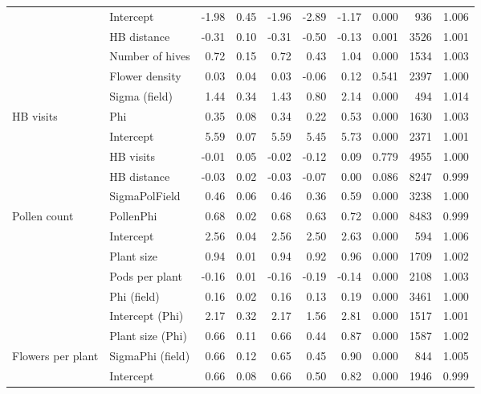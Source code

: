 \begin{table}[ht]
\begin{tabular}{l|l|r|r|r|r|r|r|r|r}
 & Intercept & -1.98 & 0.45 & -1.96 & -2.89 & -1.17 & 0.000 & 936 & 1.006\\
\cline{2-10}
 & HB distance & -0.31 & 0.10 & -0.31 & -0.50 & -0.13 & 0.001 & 3526 & 1.001\\
\cline{2-10}
 & Number of hives & 0.72 & 0.15 & 0.72 & 0.43 & 1.04 & 0.000 & 1534 & 1.003\\
\cline{2-10}
 & Flower density & 0.03 & 0.04 & 0.03 & -0.06 & 0.12 & 0.541 & 2397 & 1.000\\
\cline{2-10}
 & Sigma (field) & 1.44 & 0.34 & 1.43 & 0.80 & 2.14 & 0.000 & 494 & 1.014\\
\cline{2-10}
\multirow{-6}{*}{\raggedright\arraybackslash HB visits} & Phi & 0.35 & 0.08 & 0.34 & 0.22 & 0.53 & 0.000 & 1630 & 1.003\\
\cline{1-10}
 & Intercept & 5.59 & 0.07 & 5.59 & 5.45 & 5.73 & 0.000 & 2371 & 1.001\\
\cline{2-10}
 & HB visits & -0.01 & 0.05 & -0.02 & -0.12 & 0.09 & 0.779 & 4955 & 1.000\\
\cline{2-10}
 & HB distance & -0.03 & 0.02 & -0.03 & -0.07 & 0.00 & 0.086 & 8247 & 0.999\\
\cline{2-10}
 & SigmaPolField & 0.46 & 0.06 & 0.46 & 0.36 & 0.59 & 0.000 & 3238 & 1.000\\
\cline{2-10}
\multirow{-5}{*}{\raggedright\arraybackslash Pollen count} & PollenPhi & 0.68 & 0.02 & 0.68 & 0.63 & 0.72 & 0.000 & 8483 & 0.999\\
\cline{1-10}
 & Intercept & 2.56 & 0.04 & 2.56 & 2.50 & 2.63 & 0.000 & 594 & 1.006\\
\cline{2-10}
 & Plant size & 0.94 & 0.01 & 0.94 & 0.92 & 0.96 & 0.000 & 1709 & 1.002\\
\cline{2-10}
 & Pods per plant & -0.16 & 0.01 & -0.16 & -0.19 & -0.14 & 0.000 & 2108 & 1.003\\
\cline{2-10}
 & Phi (field) & 0.16 & 0.02 & 0.16 & 0.13 & 0.19 & 0.000 & 3461 & 1.000\\
\cline{2-10}
 & Intercept (Phi) & 2.17 & 0.32 & 2.17 & 1.56 & 2.81 & 0.000 & 1517 & 1.001\\
\cline{2-10}
 & Plant size (Phi) & 0.66 & 0.11 & 0.66 & 0.44 & 0.87 & 0.000 & 1587 & 1.002\\
\cline{2-10}
\multirow{-7}{*}{\raggedright\arraybackslash Flowers per plant} & SigmaPhi (field) & 0.66 & 0.12 & 0.65 & 0.45 & 0.90 & 0.000 & 844 & 1.005\\
\cline{1-10}
 & Intercept & 0.66 & 0.08 & 0.66 & 0.50 & 0.82 & 0.000 & 1946 & 0.999\\

\end{tabular}
\end{table}
